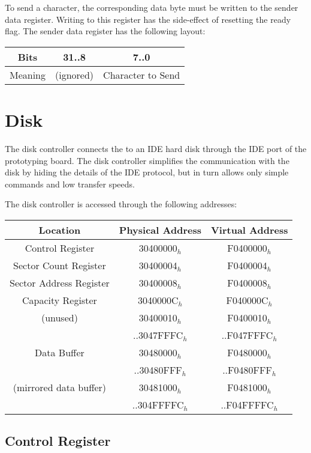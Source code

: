 To send a character, the corresponding data byte must be written to the sender data register. Writing to this register has the side-effect of resetting the ready flag. The sender data register has the following layout:

\begin{tabular}{|c|c|c|}
\hline
Bits & 31..8 & 7..0\\
\hline
Meaning & (ignored) & Character to Send\\
\hline
\end{tabular}

\section{Disk}

The disk controller connects the \eco to an IDE hard disk through the IDE port of the prototyping board. The disk controller simplifies the communication with the disk by hiding the details of the IDE protocol, but in turn allows only simple commands and low transfer speeds.

The disk controller is accessed through the following addresses:

\begin{tabular}{|c|c|c|}
\hline
Location & Physical Address & Virtual Address\\
\hline
Control Register & 30400000$_h$ & F0400000$_h$\\
\hline
Sector Count Register & 30400004$_h$ & F0400004$_h$\\
\hline
Sector Address Register & 30400008$_h$ & F0400008$_h$\\
\hline
Capacity Register & 3040000C$_h$ & F040000C$_h$\\
\hline
(unused) & 30400010$_h$ & F0400010$_h$\\
& ..3047FFFC$_h$ & ..F047FFFC$_h$\\
\hline
Data Buffer & 30480000$_h$ & F0480000$_h$\\
& ..30480FFF$_h$ & ..F0480FFF$_h$\\
\hline
(mirrored data buffer) & 30481000$_h$ & F0481000$_h$\\
& ..304FFFFC$_h$ & ..F04FFFFC$_h$\\
\hline
\end{tabular}

\subsection{Control Register}

